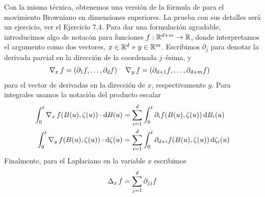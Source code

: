 Con la misma técnica, obtenemos una versión de la fórmula de \ito para el movimiento Browniano en dimensiones superiores.
La prueba con sus detalles será un ejercicio, ver el Ejercicio 7.4.
Para dar una formulación agradable, introducimos algo de notacón para funciones \(f : \mathbb{R}^{d + m} \rightarrow \mathbb{R}\), donde interpretamos el argumento como dos vectores, \(x \in \mathbb{R}^d\) e \(y \in \mathbb{R}^m\).
Escribimos \(\partial_j\) para denotar la derivada parcial en la dirección de la coordenada \(j\)--ésima, y
\begin{align}
  &\operatorname{\nabla}_x f = (\partial_1 f, \dots, \partial_d f)
  &
  &\operatorname{\nabla}_y f = (\partial_{d + 1} f, \dots, \partial_{d + m} f)
\end{align}
para el vector de derivadas en la dirección de \(x\), respectivamente \(y\).
Para integrales usamos la notación del producto escalar
\begin{align}
  \int_0^t \operatorname{\nabla}_x f(B(u), \zeta(u)) \cdot \mathop{}\!\mathrm{d} B(u)
  &=
  \sum_{i = 1}^d \int_0^t \partial_i f(B(u), \zeta(u)) \mathop{}\!\mathrm{d} B_i(u)
  \\
  \int_0^t \operatorname{\nabla}_y f(B(u), \zeta(u)) \cdot \mathop{}\!\mathrm{d} \zeta(u)
  &=
  \sum_{i = 1}^d \int_0^t \partial_{d + i} f(B(u), \zeta(u)) \mathop{}\!\mathrm{d} \zeta_i(u)
\end{align}
Finalmente, para el Laplaciano en la variable \(x\) escribimos
\begin{align}
  \operatorname{\Delta}_x f
  =
  \sum_{j = 1}^d \partial_{j j} f
\end{align}

